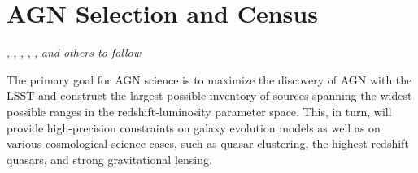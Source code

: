 %
%
%
%
%
%
%

\section{AGN Selection and Census}
\def\secname{\chpname:census}\label{sec:\secname}

,
,
,
,
,
{\it and others to follow}




The primary goal for AGN science is to maximize the discovery of AGN
with the LSST and construct the largest possible inventory of sources
spanning the widest possible ranges in the redshift-luminosity parameter
space. This, in turn, will provide high-precision constraints on galaxy
evolution models as well as on various cosmological science cases,
such as quasar clustering, the highest redshift quasars, and
strong gravitational lensing.

